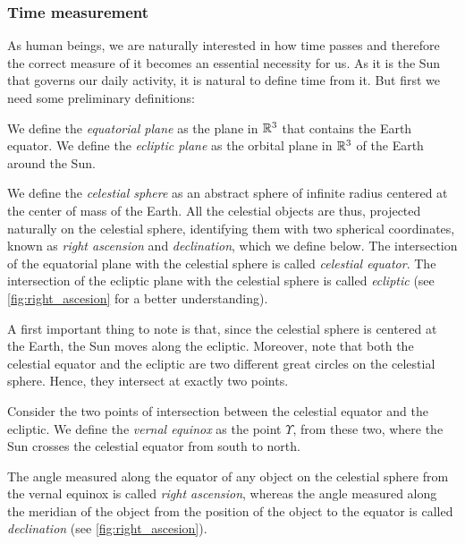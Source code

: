 \documentclass[../main.tex]{subfiles}
\begin{document}
\subsubsection{Time measurement}\label{sec:time_measurement}
As human beings, we are naturally interested in how time passes and therefore the correct measure of it becomes an essential necessity for us. As it is the Sun that governs our daily activity, it is natural to define time from it.
But first we need some preliminary definitions:
\begin{definition}
  We define the \emph{equatorial plane} as the plane in $\mathbb{R}^3$ that contains the Earth equator. We define the \emph{ecliptic plane} as the orbital plane in $\mathbb{R}^3$ of the Earth around the Sun.
\end{definition}
\begin{definition}
  We define the \emph{celestial sphere} as an abstract sphere of infinite radius centered at the center of mass of the Earth. All the celestial objects are thus, projected naturally on the celestial sphere, identifying them with two spherical coordinates, known as \emph{right ascension} and \emph{declination}, which we define below. The intersection of the equatorial plane with the celestial sphere is called \emph{celestial equator}. The intersection of the ecliptic plane with the celestial sphere is called \emph{ecliptic} (see \cref{fig:right_ascesion} for a better understanding).
\end{definition}
A first important thing to note is that, since the celestial sphere is centered at the Earth, the Sun moves along the ecliptic. Moreover, note that both the celestial equator and the ecliptic are two different great circles on the celestial sphere. Hence, they intersect at exactly two points.

\begin{definition}
  Consider the two points of intersection between the celestial equator and the ecliptic. We define the \emph{vernal equinox} as the point $\Upsilon$, from these two, where the Sun crosses the celestial equator from south to north.
\end{definition}
The angle measured along the equator of any object on the celestial sphere from the vernal equinox is called \emph{right ascension}, whereas the angle measured along the meridian of the object from the position of the object to the equator is called \emph{declination} (see \cref{fig:right_ascesion}).
\end{document}
